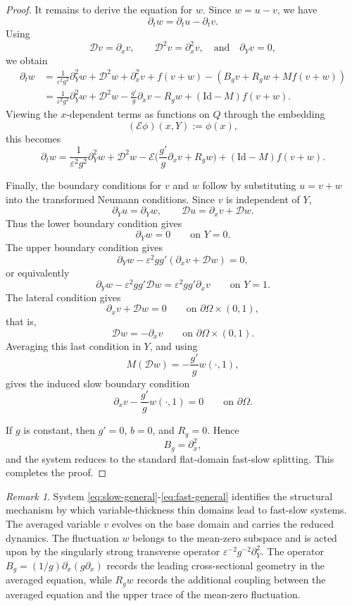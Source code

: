\documentclass[11pt]{article}
\theoremstyle{definition}
\theoremstyle{remark}
\newtheorem{remark}[theorem]{Remark}
\numberwithin{equation}{section}
\newcommand{\Id}{\mathrm{Id}}
\begin{document}
\begin{proof}
It remains to derive the equation for \(w\). Since \(w=u-v\), we have
\[
\partial_tw=\partial_tu-\partial_tv.
\]
Using
\[
\mathcal Dv=\partial_xv,
\qquad
\mathcal D^2v=\partial_x^2v,
\quad \text{and}\quad 
\partial_Yv=0,
\]
we obtain
\[
\begin{aligned}
\partial_tw
&=
\frac1{\varepsilon^2g^2}\partial_Y^2w
+
\mathcal D^2w
+
\partial_x^2v
+
f(v+w)
-
\left(
 B_gv+R_gw+Mf(v+w)
\right)
\\
&=
\frac1{\varepsilon^2g^2}\partial_Y^2w
+
\mathcal D^2w
-
\frac{g'}g\partial_xv
-
R_gw
+
(\Id-M)f(v+w).
\end{aligned}
\]
Viewing the \(x\)-dependent terms as functions on \(Q\) through the embedding
\[
(\mathcal E\phi)(x,Y):=\phi(x),
\]
this becomes
\[
\partial_tw
=
\frac1{\varepsilon^2g^2}\partial_Y^2w
+
\mathcal D^2w
-
\mathcal E\bigl(\frac{g'}g\partial_xv+R_gw\bigr)
+
(\Id-M)f(v+w).
\]

Finally, the boundary conditions for \(v\) and \(w\) follow by substituting \(u=v+w\) into the
transformed Neumann conditions. Since \(v\) is independent of \(Y\),
\[
\partial_Yu=\partial_Yw,
\qquad
\mathcal Du=\partial_xv+\mathcal Dw.
\]
Thus the lower boundary condition gives
\[
\partial_Yw=0
\qquad\text{on }Y=0.
\]
The upper boundary condition gives
\[
\partial_Yw-\varepsilon^2gg'(\partial_xv+\mathcal Dw)=0,
\]
or equivalently
\[
\partial_Yw-\varepsilon^2gg'\mathcal Dw
=
\varepsilon^2gg'\partial_xv
\qquad\text{on }Y=1.
\]
The lateral condition gives
\[
\partial_xv+\mathcal Dw=0
\qquad\text{on }\partial\Omega\times(0,1),
\]
that is,
\[
\mathcal Dw=-\partial_xv
\qquad\text{on }\partial\Omega\times(0,1).
\]
Averaging this last condition in \(Y\), and using
\[
M(\mathcal Dw)
=
-\frac{g'}gw(\cdot,1),
\]
gives the induced slow boundary condition
\[
\partial_xv- \frac{g'}gw(\cdot,1)=0
\qquad\text{on }\partial\Omega.
\]

If \(g\) is constant, then \(g'=0\), \(b=0\), and \(R_g=0\). Hence
\[
 B_g=\partial_x^2,
\]
and the system reduces to the standard flat-domain fast-slow splitting. This completes the proof.
\end{proof}

\begin{remark}
System \eqref{eq:slow-general}-\eqref{eq:fast-general} identifies the structural mechanism by which variable-thickness thin domains lead to fast-slow systems.
The averaged variable \(v\) evolves on the base domain and carries the reduced dynamics.
The fluctuation \(w\) belongs to the mean-zero subspace and is acted upon by the singularly strong transverse operator \(\varepsilon^{-2}g^{-2}\partial_Y^2\).
The operator \(B_g=(1/g)\partial_x(g\partial_x)\) records the leading cross-sectional geometry in the averaged equation, while \(R_gw\) records the additional coupling between the averaged equation and the upper trace of the mean-zero fluctuation.
\end{remark}
\end{document}
